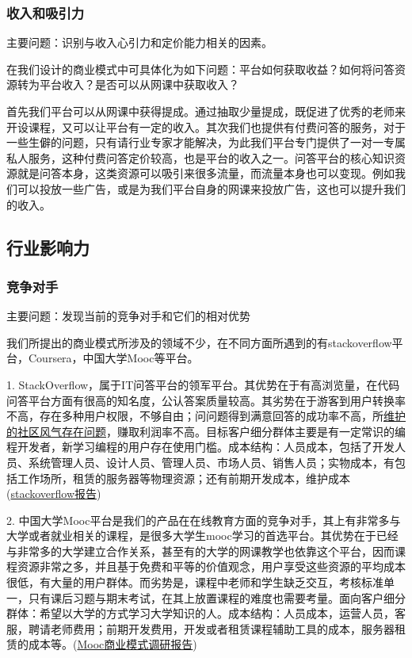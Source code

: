 \documentclass[a4paper]{ctexart}
\begin{document}
\subsubsection{收入和吸引力}
主要问题：识别与收入心引力和定价能力相关的因素。

在我们设计的商业模式中可具体化为如下问题：平台如何获取收益？如何将问答资源转为平台收入？是否可以从网课中获取收入？

首先我们平台可以从网课中获得提成。通过抽取少量提成，既促进了优秀的老师来开设课程，又可以让平台有一定的收入。其次我们也提供有付费问答的服务，对于一些生僻的问题，只有请行业专家才能解决，为此我们平台专门提供了一对一专属私人服务，这种付费问答定价较高，也是平台的收入之一。问答平台的核心知识资源就是问答本身，这类资源可以吸引来很多流量，而流量本身也可以变现。例如我们可以投放一些广告，或是为我们平台自身的网课来投放广告，这也可以提升我们的收入。

\subsection{行业影响力}
\subsubsection{竞争对手}
主要问题：发现当前的竞争对手和它们的相对优势

我们所提出的商业模式所涉及的领域不少，在不同方面所遇到的有stackoverflow平台，Coursera，中国大学Mooc等平台。

1. StackOverflow，属于IT问答平台的领军平台。其优势在于有高浏览量，在代码问答平台方面有很高的知名度，公认答案质量较高。其劣势在于游客到用户转换率不高，存在多种用户权限，不够自由；问问题得到满意回答的成功率不高，所\href{https://hackernoon.com/the-decline-of-stack-overflow-7cb69faa575d the decline of Stack Overflow}{维护的社区风气存在问题}，赚取利润率不高。目标客户细分群体主要是有一定常识的编程开发者，新学习编程的用户存在使用门槛。成本结构：人员成本，包括了开发人员、系统管理人员、设计人员、管理人员、市场人员、销售人员；实物成本，有包括工作场所，租赁的服务器等物理资源；还有前期开发成本，维护成本(\href{https://stackoverflow.blog/2016/11/15/how-we-make-money-at-stack-overflow-2016-edition/}{stackoverflow报告})

2. 中国大学Mooc平台是我们的产品在在线教育方面的竞争对手，其上有非常多与大学或者就业相关的课程，是很多大学生mooc学习的首选平台。其优势在于已经与非常多的大学建立合作关系，甚至有的大学的网课教学也依靠这个平台，因而课程资源非常之多，并且基于免费和平等的价值观念，用户享受这些资源的平均成本很低，有大量的用户群体。而劣势是，课程中老师和学生缺乏交互，考核标准单一，只有课后习题与期末考试，在其上放置课程的难度也需要考量。面向客户细分群体：希望以大学的方式学习大学知识的人。成本结构：人员成本，运营人员，客服，聘请老师费用；前期开发费用，开发或者租赁课程辅助工具的成本，服务器租赁的成本等。(\href{https://x.cnki.net/KCMS/detail/detail.aspx?dbcode=CMFD&dbname=CMFD201601&filename=1015804120.nh&uid=WEEvREcwSlJHSldTTEYzVnBFak5MTnFramlsMnh5RjR5NUZpQzA1a0FZVT0=$9A4hF_YAuvQ5obgVAqNKPCYcEjKensW4ggI8Fm4gTkoUKaID8j8gFw!!&v=MjA1OTk4ZVgxTHV4WVM3RGgxVDNxVHJXTTFGckNVUjdxZlkrUnFGeWpsVmJ6SlZGMjZHN3U0R3RET3I1RWJQSVI=}{Mooc商业模式调研报告})
\end{document}
